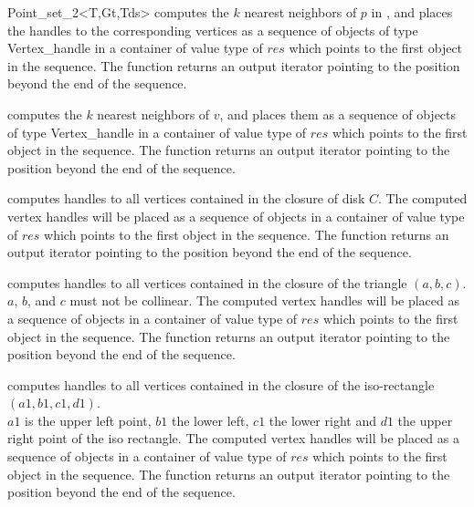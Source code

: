 \begin{ccRefClass}{Point_set_2<T,Gt,Tds>}
{ computes the $k$ nearest neighbors of $p$ in \ccVar, and places the
handles to the corresponding vertices as a sequence of objects of type
Vertex\_handle in a container of value type of $res$
which points to the first object in the sequence. The function
returns an output iterator pointing to the position beyond the end
of the sequence. }

{ computes the $k$ nearest neighbors of $v$, and places them as a sequence of objects of type
Vertex\_handle in a container of value type of $res$
which points to the first object in the sequence. The function
returns an output iterator pointing to the position beyond the end
of the sequence. }

{ computes handles to all vertices contained in the closure of disk $C$.
The computed vertex handles will be placed as a sequence of objects in a container of value type
of $res$
which points to the first object in the sequence. The function
returns an output iterator pointing to the position beyond the end
of the sequence.
}

{ computes handles to all vertices contained in the closure of the triangle $(a,b,c)$.\\
\ccPrecond $a$, $b$, and $c$ must not be collinear. 
The computed vertex handles will be placed as a sequence of objects in a container of value type
of $res$
which points to the first object in the sequence. The function
returns an output iterator pointing to the position beyond the end
of the sequence.
}

{ computes handles to all vertices contained in the closure of the iso-rectangle $(a1,b1,c1,d1)$.\\
\ccPrecond $a1$ is the upper left point, $b1$ the lower left, $c1$ the lower
right and $d1$ the upper right point of the iso rectangle.
The computed vertex handles will be placed as a sequence of objects in a container of value type
of $res$
which points to the first object in the sequence. The function
returns an output iterator pointing to the position beyond the end
of the sequence.
}


\end{ccRefClass}
